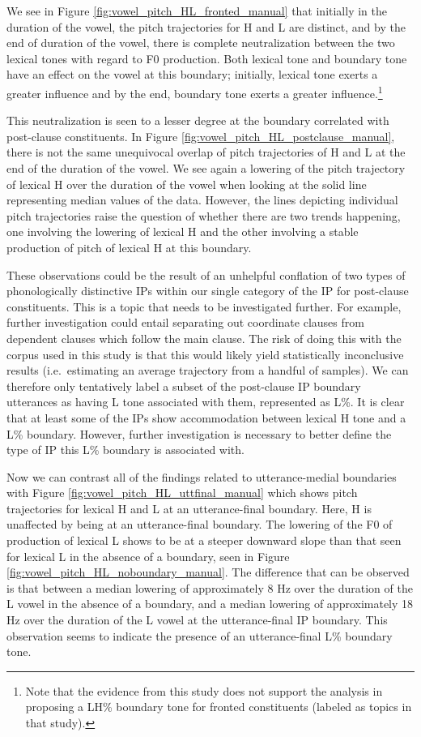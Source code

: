 \documentclass[
  11pt,
  b5paper,
]{article}
\begin{document}
We see in Figure \ref{fig:vowel_pitch_HL_fronted_manual} that initially
in the duration of the vowel, the pitch trajectories for H and L are
distinct, and by the end of duration of the vowel, there is complete
neutralization between the two lexical tones with regard to F0
production. Both lexical tone and boundary tone have an effect on the
vowel at this boundary; initially, lexical tone exerts a greater
influence and by the end, boundary tone exerts a greater
influence.\footnote{Note that the evidence from this study does not
  support the analysis in \textcite{Beavon-Ham2019Tone} proposing a LH\%
  boundary tone for fronted constituents (labeled as topics in that
  study).}

This neutralization is seen to a lesser degree at the boundary
correlated with post-clause constituents. In Figure
\ref{fig:vowel_pitch_HL_postclause_manual}, there is not the same
unequivocal overlap of pitch trajectories of H and L at the end of the
duration of the vowel. We see again a lowering of the pitch trajectory
of lexical H over the duration of the vowel when looking at the solid
line representing median values of the data. However, the lines
depicting individual pitch trajectories raise the question of whether
there are two trends happening, one involving the lowering of lexical H
and the other involving a stable production of pitch of lexical H at
this boundary.

These observations could be the result of an unhelpful conflation of two
types of phonologically distinctive IPs within our single category of
the IP for post-clause constituents. This is a topic that needs to be
investigated further. For example, further investigation could entail
separating out coordinate clauses from dependent clauses which follow
the main clause. The risk of doing this with the corpus used in this
study is that this would likely yield statistically inconclusive results
(i.e.~estimating an average trajectory from a handful of samples). We
can therefore only tentatively label a subset of the post-clause IP
boundary utterances as having L tone associated with them, represented
as L\%. It is clear that at least some of the IPs show accommodation
between lexical H tone and a L\% boundary. However, further
investigation is necessary to better define the type of IP this L\%
boundary is associated with.

Now we can contrast all of the findings related to utterance-medial
boundaries with Figure \ref{fig:vowel_pitch_HL_uttfinal_manual} which
shows pitch trajectories for lexical H and L at an utterance-final
boundary. Here, H is unaffected by being at an utterance-final boundary.
The lowering of the F0 of production of lexical L shows to be at a
steeper downward slope than that seen for lexical L in the absence of a
boundary, seen in Figure \ref{fig:vowel_pitch_HL_noboundary_manual}. The
difference that can be observed is that between a median lowering of
approximately 8 Hz over the duration of the L vowel in the absence of a
boundary, and a median lowering of approximately 18 Hz over the duration
of the L vowel at the utterance-final IP boundary. This observation
seems to indicate the presence of an utterance-final L\% boundary tone.
\end{document}
